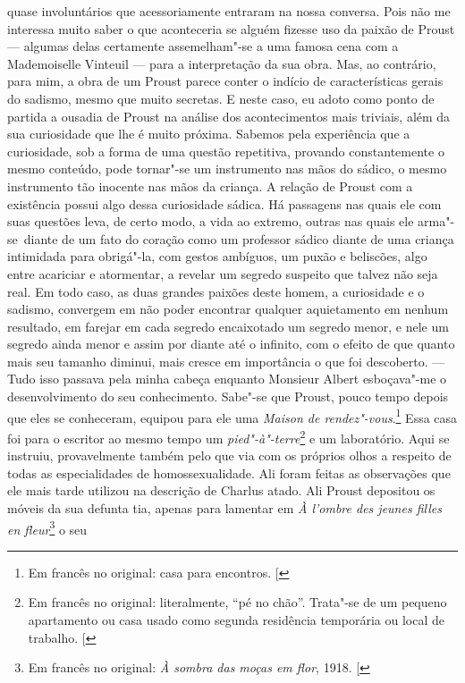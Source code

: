 quase involuntários que acessoriamente entraram na nossa conversa. Pois
não me interessa muito saber o que aconteceria se alguém fizesse uso da
paixão de Proust --- algumas delas certamente assemelham"-se a uma famosa
cena com a Mademoiselle Vinteuil --- para a interpretação da sua obra.
Mas, ao contrário, para mim, a obra de um Proust parece conter o indício
de características gerais do sadismo, mesmo que muito secretas. E neste
caso, eu adoto como ponto de partida a ousadia de Proust na análise dos
acontecimentos mais triviais, além da sua curiosidade que lhe é muito
próxima. Sabemos pela experiência que a curiosidade, sob a forma de uma
questão repetitiva, provando constantemente o mesmo conteúdo, pode
tornar"-se um instrumento nas mãos do sádico, o mesmo instrumento tão
inocente nas mãos da criança. A relação de Proust com a existência
possui algo dessa curiosidade sádica. Há passagens nas quais ele com
suas questões leva, de certo modo, a vida ao extremo, outras nas quais
ele arma"-se~diante de um fato do coração como um professor sádico diante
de uma criança intimidada para obrigá"-la, com gestos ambíguos, um puxão
e beliscões, algo entre acariciar e atormentar, a revelar um segredo
suspeito que talvez não seja real. Em todo caso, as duas grandes paixões
deste homem, a curiosidade e o sadismo, convergem em não poder encontrar
qualquer aquietamento em nenhum resultado, em farejar em cada segredo
encaixotado um segredo menor, e nele um segredo ainda menor e assim por
diante até o infinito, com o efeito de que quanto mais seu tamanho
diminui, mais cresce em importância o que foi descoberto. --- Tudo isso
passava pela minha cabeça enquanto Monsieur Albert esboçava"-me o
desenvolvimento do seu conhecimento. Sabe"-se que Proust, pouco tempo
depois que eles se conheceram, equipou para ele uma \emph{Maison de
rendez"-vous}.\footnote{Em francês no original:  casa para encontros. {[}\versal{N.~T.}{]}} Essa casa foi para o escritor ao mesmo tempo um
\emph{pied"-à"-terre}\footnote{Em francês no original: literalmente, ``pé no chão''. Trata"-se de um pequeno apartamento ou casa usado como segunda residência temporária ou local de trabalho. {[}\versal{N.~T.}{]}} e um laboratório. Aqui se instruiu,
provavelmente também pelo que via com os próprios olhos a respeito de
todas as especialidades de homossexualidade. Ali foram feitas as
observações que ele mais tarde utilizou na descrição de Charlus
atado. Ali Proust depositou os móveis da sua defunta tia, apenas
para lamentar em \emph{À l'ombre des jeunes filles en fleur}\footnote{Em francês no original: \emph{À sombra das moças em flor}, 1918. {[}\versal{N.~T.}{]}} o seu

